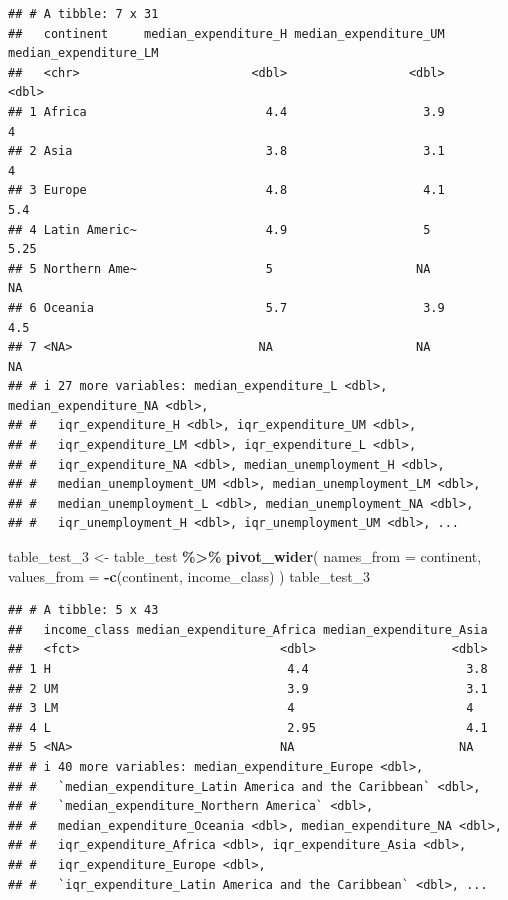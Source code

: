 \documentclass[
]{article}
\newenvironment{Shaded}{\begin{snugshade}}{\end{snugshade}}
\newcommand{\AttributeTok}[1]{\textcolor[rgb]{0.13,0.29,0.53}{#1}}
\newcommand{\FunctionTok}[1]{\textcolor[rgb]{0.13,0.29,0.53}{\textbf{#1}}}
\newcommand{\NormalTok}[1]{#1}
\newcommand{\OtherTok}[1]{\textcolor[rgb]{0.56,0.35,0.01}{#1}}
\newcommand{\SpecialCharTok}[1]{\textcolor[rgb]{0.81,0.36,0.00}{\textbf{#1}}}
\begin{document}
\begin{verbatim}
## # A tibble: 7 x 31
##   continent     median_expenditure_H median_expenditure_UM median_expenditure_LM
##   <chr>                        <dbl>                 <dbl>                 <dbl>
## 1 Africa                         4.4                   3.9                  4   
## 2 Asia                           3.8                   3.1                  4   
## 3 Europe                         4.8                   4.1                  5.4 
## 4 Latin Americ~                  4.9                   5                    5.25
## 5 Northern Ame~                  5                    NA                   NA   
## 6 Oceania                        5.7                   3.9                  4.5 
## 7 <NA>                          NA                    NA                   NA   
## # i 27 more variables: median_expenditure_L <dbl>, median_expenditure_NA <dbl>,
## #   iqr_expenditure_H <dbl>, iqr_expenditure_UM <dbl>,
## #   iqr_expenditure_LM <dbl>, iqr_expenditure_L <dbl>,
## #   iqr_expenditure_NA <dbl>, median_unemployment_H <dbl>,
## #   median_unemployment_UM <dbl>, median_unemployment_LM <dbl>,
## #   median_unemployment_L <dbl>, median_unemployment_NA <dbl>,
## #   iqr_unemployment_H <dbl>, iqr_unemployment_UM <dbl>, ...
\end{verbatim}

\begin{Shaded}
\begin{Highlighting}[]
\NormalTok{table\_test\_3 }\OtherTok{\textless{}{-}}\NormalTok{ table\_test }\SpecialCharTok{\%\textgreater{}\%}
  \FunctionTok{pivot\_wider}\NormalTok{(}
    \AttributeTok{names\_from =}\NormalTok{ continent,}
    \AttributeTok{values\_from =} \SpecialCharTok{{-}}\FunctionTok{c}\NormalTok{(continent, income\_class)}
\NormalTok{  )}
\NormalTok{table\_test\_3}
\end{Highlighting}
\end{Shaded}

\begin{verbatim}
## # A tibble: 5 x 43
##   income_class median_expenditure_Africa median_expenditure_Asia
##   <fct>                            <dbl>                   <dbl>
## 1 H                                 4.4                      3.8
## 2 UM                                3.9                      3.1
## 3 LM                                4                        4  
## 4 L                                 2.95                     4.1
## 5 <NA>                             NA                       NA  
## # i 40 more variables: median_expenditure_Europe <dbl>,
## #   `median_expenditure_Latin America and the Caribbean` <dbl>,
## #   `median_expenditure_Northern America` <dbl>,
## #   median_expenditure_Oceania <dbl>, median_expenditure_NA <dbl>,
## #   iqr_expenditure_Africa <dbl>, iqr_expenditure_Asia <dbl>,
## #   iqr_expenditure_Europe <dbl>,
## #   `iqr_expenditure_Latin America and the Caribbean` <dbl>, ...
\end{verbatim}
\end{document}
